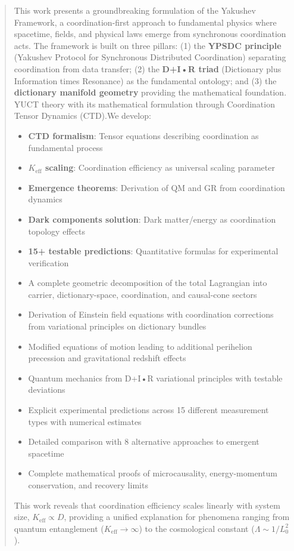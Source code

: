 \documentclass[11pt,a4paper]{article}
\begin{document}
	\begin{abstract}
		This work presents a groundbreaking formulation of the Yakushev Framework, a coordination-first approach to fundamental physics where spacetime, fields, and physical laws emerge from synchronous coordination acts. The framework is built on three pillars: (1) the \textbf{YPSDC principle} (Yakushev Protocol for Synchronous Distributed Coordination) separating coordination from data transfer; (2) the \textbf{D+I•R triad} (Dictionary plus Information times Resonance) as the fundamental ontology; and (3) the \textbf{dictionary manifold geometry} providing the mathematical foundation. YUCT theory with its mathematical formulation through Coordination Tensor Dynamics (CTD).We develop:
		\begin{itemize}
			\item \textbf{CTD formalism}: Tensor equations describing coordination as fundamental process
			\item \textbf{$K_{\mathrm{eff}}$ scaling}: Coordination efficiency as universal scaling parameter
			\item \textbf{Emergence theorems}: Derivation of QM and GR from coordination dynamics
			\item \textbf{Dark components solution}: Dark matter/energy as coordination topology effects
			\item \textbf{15+ testable predictions}: Quantitative formulas for experimental verification
			\item A complete geometric decomposition of the total Lagrangian into carrier, dictionary-space, coordination, and causal-cone sectors
			\item Derivation of Einstein field equations with coordination corrections from variational principles on dictionary bundles
			\item Modified equations of motion leading to additional perihelion precession and gravitational redshift effects
			\item Quantum mechanics from D+I•R variational principles with testable deviations
			\item Explicit experimental predictions across 15 different measurement types with numerical estimates
			\item Detailed comparison with 8 alternative approaches to emergent spacetime
			\item Complete mathematical proofs of microcausality, energy-momentum conservation, and recovery limits
		\end{itemize}
		This work reveals that coordination efficiency scales linearly with system 
		size, $K_{\mathrm{eff}} \propto D$, providing a unified explanation for 
		phenomena ranging from quantum entanglement ($K_{\mathrm{eff}} \to \infty$) 
		to the cosmological constant ($\Lambda \sim 1/L_0^2$).
		

\end{abstract}
\end{document}
